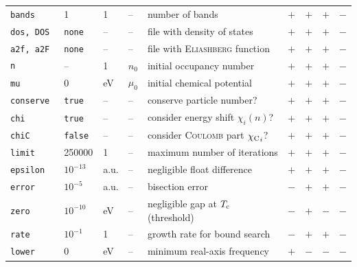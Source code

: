 \documentclass[a4paper]{article}
\def\sub#1{\sb{\mathrm{#1}}}
\newlength\gap
\begin{document}
\begin{table}[b]
\begin{tabular}{*9l}
         \tt bands         & 1           & 1                & --                  & number of bands                            & $+$ & $+$ & $+$ & $-$ \\[\gap]
         \tt dos, DOS      & \tt none    & --               & --                  & file with density of states                & $+$ & $+$ & $+$ & $-$ \\
         \tt a2f, a2F      & \tt none    & --               & --                  & file with \textsc{Eliashberg} function     & $+$ & $+$ & $+$ & $-$ \\[\gap]
         \tt n             & --          & 1                & $n_0$               & initial occupancy number                   & $+$ & $+$ & $+$ & $-$ \\
         \tt mu            & 0           & eV               & $\mu_0$             & initial chemical potential                 & $+$ & $+$ & $+$ & $-$ \\
         \tt conserve      & \tt true    & --               & --                  & conserve particle number?                  & $+$ & $+$ & $+$ & $-$ \\
         \tt chi           & \tt true    & --               & --                  & consider energy shift $\chi_i(n)$?         & $+$ & $+$ & $+$ & $-$ \\
         \tt chiC          & \tt false   & --               & --           & consider \textsc{Coulomb} part ${\chi \sub C}_i$? & $+$ & $+$ & $+$ & $-$ \\[\gap]
         \tt limit         & 250000      & 1                & --                  & maximum number of iterations               & $+$ & $+$ & $+$ & $-$ \\[\gap]
         \tt epsilon       & $10^{-13}$  & a.u.             & --                  & negligible float difference                & $+$ & $+$ & $+$ & $-$ \\
         \tt error         & $10^{-5}$   & a.u.             & --                  & bisection error                            & $-$ & $+$ & $+$ & $-$ \\
         \tt zero          & $10^{-10}$  & eV               & --                  & negligible gap at $T \sub c$ (threshold)   & $-$ & $+$ & $-$ & $-$ \\
         \tt rate          & $10^{-1}$   & 1                & --                  & growth rate for bound search               & $-$ & $+$ & $+$ & $-$ \\[\gap]
         \tt lower         & 0           & eV               & --                  & minimum real-axis frequency                & $+$ & $-$ & $-$ & $-$ \\

\end{tabular}
\end{table}
\end{document}
